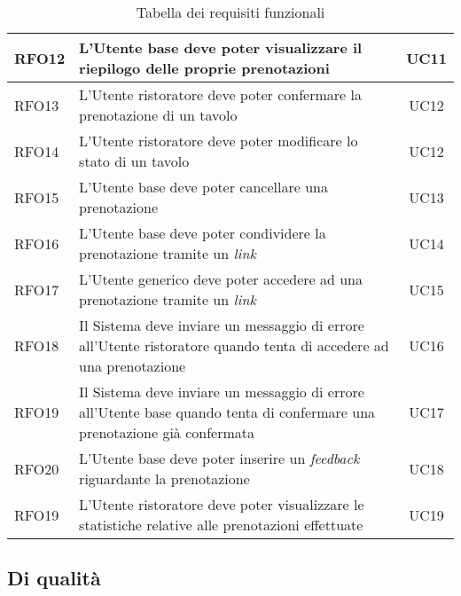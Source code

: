 \begin{table}[H]
\begin{tabularx}{\textwidth}{l|X|c}
		\hline
		RFO12       & L'Utente base deve poter visualizzare il riepilogo delle proprie prenotazioni                                             & UC11           \\
		\hline
		RFO13       & L'Utente ristoratore deve poter confermare la prenotazione di un tavolo                                                   & UC12           \\
		\hline
		RFO14       & L'Utente ristoratore deve poter modificare lo stato di un tavolo                                                          & UC12           \\
		\hline
		RFO15       & L'Utente base deve poter cancellare una prenotazione                                                                      & UC13           \\
		\hline
		RFO16       & L'Utente base deve poter condividere la prenotazione tramite un \textit{link}                                                     & UC14           \\
		\hline
		RFO17       & L'Utente generico deve poter accedere ad una prenotazione tramite un \textit{link}                                                 & UC15           \\
		\hline
		RFO18       & Il Sistema deve inviare un messaggio di errore all'Utente ristoratore quando tenta di accedere ad una prenotazione        & UC16           \\
		\hline
		RFO19       & Il Sistema deve inviare un messaggio di errore all'Utente base quando tenta di confermare una prenotazione già confermata & UC17           \\
		\hline
		RFO20       & L'Utente base deve poter inserire un \textit{feedback} riguardante la prenotazione                                                 & UC18           \\
		\hline
		RFO19       & L'Utente ristoratore deve poter visualizzare le statistiche relative alle prenotazioni effettuate                         & UC19           \\
		\hline
	\end{tabularx}
	\caption{Tabella dei requisiti funzionali}
\end{table}

\subsection{Di qualità}

